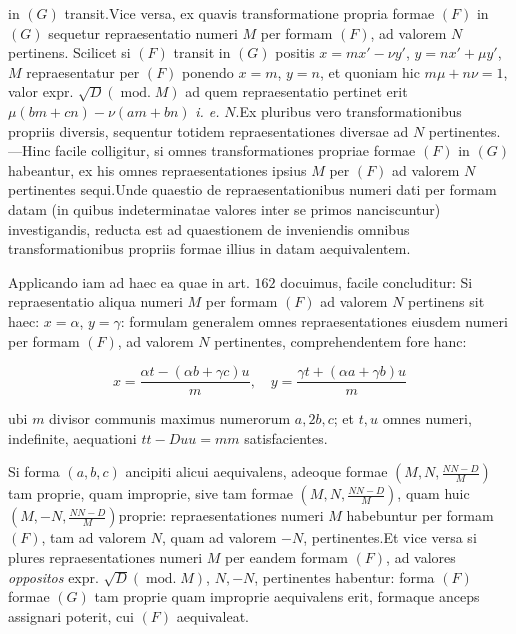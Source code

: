 in $(G)$ transit.\quad Vice versa, ex quavis transformatione propria formae $(F)$ in $(G)$ sequetur repraesentatio numeri $M$ per formam $(F)$, ad valorem $N$ pertinens. Scilicet si $(F)$ transit in $(G)$ positis $x=mx'-\nu y'$, $y=nx'+\mu y'$, $M$ repraesentatur per $(F)$ ponendo $x=m$, $y=n$, et quoniam hic $m\mu+n\nu=1$, valor expr. $\surd D(\operatorname{mod.}M)$ ad quem repraesentatio pertinet erit $\mu(bm+cn)-\nu(am+bn)$ \emph{i. e.} $N$.\quad Ex pluribus vero transformationibus propriis diversis, sequentur totidem repraesentationes diversae ad $N$ pertinentes. ---\quad Hinc facile colligitur, si omnes transformationes propriae formae $(F)$ in $(G)$ habeantur, ex his omnes repraesentationes ipsius $M$ per $(F)$ ad valorem $N$ pertinentes sequi.\quad Unde quaestio de repraesentationibus numeri dati per formam datam (in quibus indeterminatae valores inter se primos nanciscuntur) investigandis, reducta est ad quaestionem de inveniendis omnibus transformationibus propriis formae illius in datam aequivalentem.

Applicando iam ad haec ea quae in art. $162$ docuimus, facile concluditur: Si repraesentatio aliqua numeri $M$ per formam $(F)$ ad valorem $N$ pertinens sit haec: $x=\alpha$, $y=\gamma$: formulam generalem omnes repraesentationes eiusdem numeri per formam $(F)$, ad valorem $N$ pertinentes, comprehendentem fore hanc:

\[
x=\frac{\alpha t-(\alpha b+\gamma c)u}{m},\quad y=\frac{\gamma t+(\alpha a+\gamma b)u}{m}
\]

ubi $m$ divisor communis maximus numerorum $a,2b,c$; et $t,u$ omnes numeri, indefinite, aequationi $tt-Duu=mm$ satisfacientes.


Si forma $(a,b,c)$ ancipiti alicui aequivalens, adeoque formae $(M,N,\frac{NN-D}{M})$ tam proprie, quam improprie, sive tam formae $(M,N,\frac{NN-D}{M})$, quam huic $(M,-N,\frac{NN-D}{M})$\quad proprie: repraesentationes numeri $M$ habebuntur per formam $(F)$, tam ad valorem $N$, quam ad valorem $-N$, pertinentes.\quad Et vice versa si plures repraesentationes numeri $M$ per eandem formam $(F)$, ad valores \emph{oppositos} expr. $\surd D(\operatorname{mod.}M)$, $N,-N$, pertinentes habentur: forma $(F)$ formae $(G)$ tam proprie quam improprie aequivalens erit, formaque anceps assignari poterit, cui $(F)$ aequivaleat.

